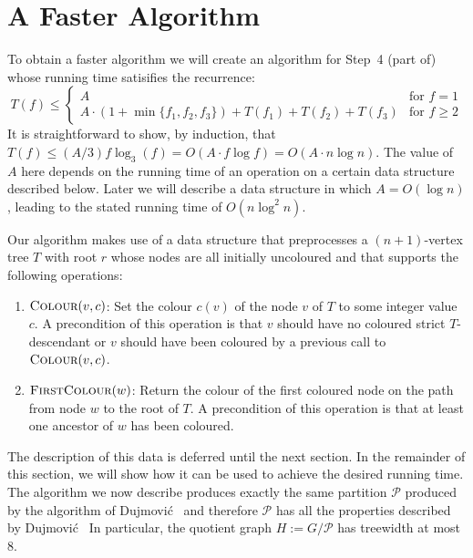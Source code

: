 \documentclass[kpfonts]{patmorin}
\let\le\leqslant
\let\ge\geqslant
\begin{document}
\section{A Faster Algorithm}

To obtain a faster algorithm we will create an algorithm for Step~4 (part of) whose running time satisifies the recurrence:
\[  T(f) \le \begin{cases}
         A & \text{for $f=1$} \\
         A\cdot(1+\min\{f_1,f_2,f_3\}) + T(f_1)+T(f_2)+T(f_3) & \text{for $f\ge 2$}
       \end{cases}
\]
It is straightforward to show, by induction, that $T(f)\le (A/3)f\log_3(f)=O(A\cdot f\log f)=O(A\cdot n\log n)$.  The value of $A$ here depends on the running time of an operation on a certain data structure described below.  Later we will describe a data structure in which $A=O(\log n)$, leading to the stated running time of $O(n\log^2 n)$.

Our algorithm makes use of a data structure that preprocesses a $(n+1)$-vertex tree $T$ with root $r$ whose nodes are all initially uncoloured and that supports the following operations:
\begin{enumerate}
   \item $\textsc{Colour}(v,c)$: Set the colour $c(v)$ of the node $v$ of $T$ to some integer value $c$.  A precondition of this operation is that $v$ should have no coloured strict $T$-descendant or $v$ should have been coloured by a previous call to $\textsc{Colour}(v,c)$.

   \item $\textsc{FirstColour}(w)$: Return the colour of the first coloured node on the path from node $w$ to the root of $T$.  A precondition of this operation is that at least one ancestor of $w$ has been coloured.
\end{enumerate}
 The description of this data is deferred until the next section.  In the remainder of this section, we will show how it can be used to achieve the desired running time.  The algorithm we now describe produces exactly the same partition $\mathcal{P}$ produced by the algorithm of Dujmović \etal\ and therefore $\mathcal{P}$ has all the properties described by Dujmović \etal\   In particular, the quotient graph $H:=G/\mathcal{P}$ has treewidth at most $8$.
\end{document}
